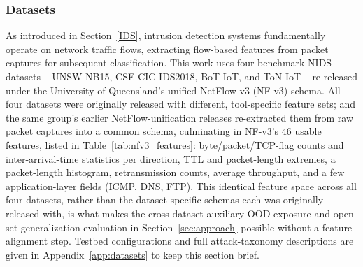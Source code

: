 \documentclass[sigconf]{acmart}
\begin{document}
\subsubsection{Datasets} \label{data}
As introduced in Section~\ref{IDS}, intrusion detection systems fundamentally operate on network traffic flows, extracting flow-based features from packet captures for subsequent classification. This work uses four benchmark NIDS datasets -- UNSW-NB15, CSE-CIC-IDS2018, BoT-IoT, and ToN-IoT -- re-released under the University of Queensland's unified NetFlow-v3 (NF-v3) schema. All four datasets were originally released with different, tool-specific feature sets; \citep{luay2025NetFlowDatasetsV3} and the same group's earlier NetFlow-unification releases re-extracted them from raw packet captures into a common schema, culminating in NF-v3's 46 usable features, listed in Table~\ref{tab:nfv3_features}: byte/packet/TCP-flag counts and inter-arrival-time statistics per direction, TTL and packet-length extremes, a packet-length histogram, retransmission counts, average throughput, and a few application-layer fields (ICMP, DNS, FTP). This identical feature space across all four datasets, rather than the dataset-specific schemas each was originally released with, is what makes the cross-dataset auxiliary OOD exposure and open-set generalization evaluation in Section~\ref{sec:approach} possible without a feature-alignment step. Testbed configurations and full attack-taxonomy descriptions are given in Appendix~\ref{app:datasets} to keep this section brief.
\end{document}
